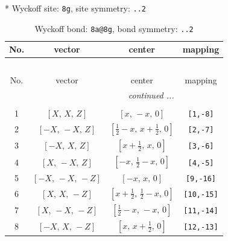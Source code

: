 \documentclass[fleqn,8pt]{jsarticle}
\begin{document}
* Wyckoff site: {\tt 8g}, site symmetry: {\tt ..2}
\renewcommand{\arraystretch}{1.2}
\begin{longtable}{cccc}
\caption{Wyckoff bond: {\tt 8a@8g}, bond symmetry: {\tt ..2}}
 \\
 \hline \hline
No. & vector & center & mapping \\ \hline \endfirsthead

\multicolumn{3}{l}{\tablename\ \thetable{}} \\
 \hline \hline
No. & vector & center & mapping \\ \hline \endhead

 \hline \hline
\multicolumn{3}{r}{\footnotesize\it continued ...} \\ \endfoot

 \hline \hline
\multicolumn{3}{r}{} \\ \endlastfoot

1 & $\left[ X,\, X,\, Z \right]$ & $\left[ x,\, - x,\, 0 \right]$ & {\tt [1,-8]} \\ \hline
2 & $\left[ - X,\, - X,\, Z \right]$ & $\left[ \frac{1}{2} - x,\, x + \frac{1}{2},\, 0 \right]$ & {\tt [2,-7]} \\ \hline
3 & $\left[ - X,\, X,\, Z \right]$ & $\left[ x + \frac{1}{2},\, x,\, 0 \right]$ & {\tt [3,-6]} \\ \hline
4 & $\left[ X,\, - X,\, Z \right]$ & $\left[ - x,\, \frac{1}{2} - x,\, 0 \right]$ & {\tt [4,-5]} \\ \hline
5 & $\left[ - X,\, - X,\, - Z \right]$ & $\left[ - x,\, x,\, 0 \right]$ & {\tt [9,-16]} \\ \hline
6 & $\left[ X,\, X,\, - Z \right]$ & $\left[ x + \frac{1}{2},\, \frac{1}{2} - x,\, 0 \right]$ & {\tt [10,-15]} \\ \hline
7 & $\left[ X,\, - X,\, - Z \right]$ & $\left[ \frac{1}{2} - x,\, - x,\, 0 \right]$ & {\tt [11,-14]} \\ \hline
8 & $\left[ - X,\, X,\, - Z \right]$ & $\left[ x,\, x + \frac{1}{2},\, 0 \right]$ & {\tt [12,-13]} \\
\end{longtable}
\renewcommand{\arraystretch}{1.2}
\end{document}

